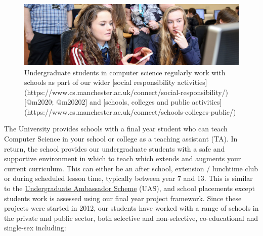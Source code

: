 \documentclass[
  12pt,
]{book}
\begin{document}
\begin{figure}

{\centering \includegraphics[width=1\linewidth]{images/schools-banner} 

}

\caption{Undergraduate students in computer science regularly work with schools as part of our wider [social responsibility activities](https://www.cs.manchester.ac.uk/connect/social-responsibility/) [@m2020; @m20202] and [schools, colleges and public activities](https://www.cs.manchester.ac.uk/connect/schools-colleges-public/)}\label{fig:unnamed-chunk-6}
\end{figure}

The University provides schools with a final year student who can teach Computer Science in your school or college as a teaching assistant (TA). In return, the school provides our undergraduate students with a safe and supportive environment in which to teach which extends and augments your current curriculum. This can either be an after school, extension / lunchtime club or during scheduled lesson time, typically between year 7 and 13. This is similar to the \href{https://en.wikipedia.org/wiki/Undergraduate_Ambassadors_Scheme}{Undergraduate Ambassador Scheme} (UAS), \citep{uas, Cooper2005} and school placements \citep{Moller2019} except students work is assessed using our final year project framework. \citep{COMP30030, COMP30040} Since these projects were started in 2012, our students have worked with a range of schools in the private and public sector, both selective and non-selective, co-educational and single-sex including:
\end{document}
